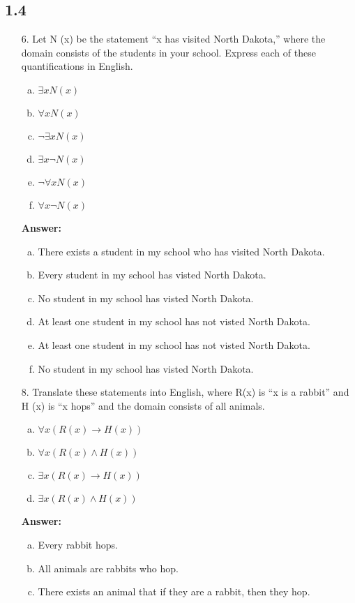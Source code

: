 \subsection{1.4}
\begin{itemize}
\item[6.] Let N (x) be the statement “x has visited North Dakota,” where
the domain consists of the students in your school. Express each of these
quantifications in English.
\begin{enumerate}[a.]
\item $\exists xN(x)$
\item $\forall xN(x)$
\item $\neg\exists xN(x)$
\item $\exists x \neg N(x)$
\item $\neg\forall xN(x)$
\item $\forall x \neg N(x)$
\end {enumerate}
\textbf{Answer:}
\begin{enumerate}[a.]
    \item There exists a student in my school who has visited North Dakota.
    \item Every student in my school has visted North Dakota.
    \item No student in my school has visted North Dakota.
    \item At least one student in my school has not visted North Dakota.
    \item At least one student in my school has not visted North Dakota.
    \item No student in my school has visted North Dakota.
\end{enumerate}
\item[8.] Translate these statements into English, where R(x) is “x is a rabbit” and H (x) is “x hops” and the domain consists of all animals.
\begin {enumerate}[a.]
\item $\forall x(R(x) \to H(x))$
\item $\forall x(R(x) \land H(x))$
\item $\exists x(R(x) \to H(x))$
\item $\exists x(R(x) \land H(x))$
\end{enumerate}
\textbf{Answer:}
\begin{enumerate}[a.]
    \item Every rabbit hops.
    \item All animals are rabbits who hop.
    \item There exists an animal that if they are a rabbit, then they hop.

\end{enumerate}
\end{itemize}
